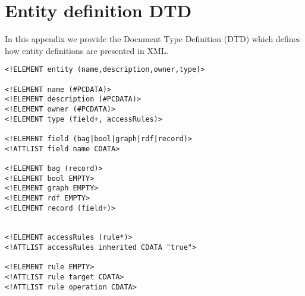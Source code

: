 
\chapter{\label{cha:dtd}Entity definition DTD}

In this appendix we provide the Document Type Definition (DTD) which defines how entity definitions are presented in XML.\\

\lstset{language=XML,basicstyle=\footnotesize\ttfamily,frame=L}
\begin{lstlisting}
<!ELEMENT entity (name,description,owner,type)>

<!ELEMENT name (#PCDATA)>
<!ELEMENT description (#PCDATA)>
<!ELEMENT owner (#PCDATA)>
<!ELEMENT type (field+, accessRules)>

<!ELEMENT field (bag|bool|graph|rdf|record)>
<!ATTLIST field name CDATA>

<!ELEMENT bag (record)>
<!ELEMENT bool EMPTY>
<!ELEMENT graph EMPTY>
<!ELEMENT rdf EMPTY>
<!ELEMENT record (field+)>


<!ELEMENT accessRules (rule*)>
<!ATTLIST accessRules inherited CDATA "true">

<!ELEMENT rule EMPTY>
<!ATTLIST rule target CDATA>
<!ATTLIST rule operation CDATA>
\end{lstlisting}


